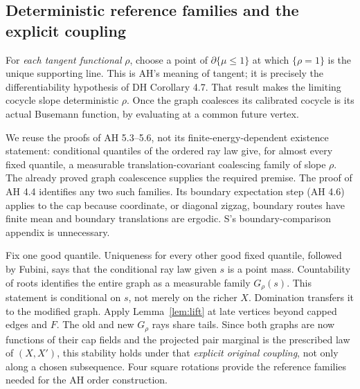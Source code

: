 \subsection{Deterministic reference families and the explicit coupling}
For \emph{each tangent functional} $\rho$, choose a point of $\partial\{\mu\le1\}$
at which $\{\rho=1\}$ is the unique supporting line. This is AH's meaning
of tangent; it is precisely the differentiability hypothesis of DH
Corollary 4.7. That result makes the limiting cocycle slope deterministic
$\rho$. Once the graph coalesces its calibrated cocycle is its actual
Busemann function, by evaluating at a common future vertex.

We reuse the proofs of AH 5.3--5.6, not its finite-energy-dependent existence
statement: conditional quantiles of the ordered ray law give, for almost
every fixed quantile, a measurable translation-covariant coalescing family
of slope $\rho$. The already proved graph coalescence supplies the required
premise. The proof of AH 4.4 identifies any two such families. Its boundary
expectation step (AH 4.6) applies to the cap because coordinate, or diagonal
zigzag, boundary routes have finite mean and boundary translations are
ergodic. S's boundary-comparison appendix is unnecessary.

Fix one good quantile. Uniqueness for every other good fixed quantile,
followed by Fubini, says that the conditional ray law given $s$ is a point
mass. Countability of roots identifies the entire graph as a measurable
family $G_\rho(s)$. This statement is conditional on $s$, not merely on
the richer $X$. Domination transfers it to the modified graph.
Apply Lemma~\ref{lem:lift} at late vertices beyond capped edges and $F$.
The old and new $G_\rho$ rays share tails. Since both graphs are now
functions of their cap fields and the projected pair marginal is the
prescribed law of $(X,X')$, this stability holds under that \emph{explicit
original coupling}, not only along a chosen subsequence. Four square
rotations provide the reference families needed for the AH order construction.
